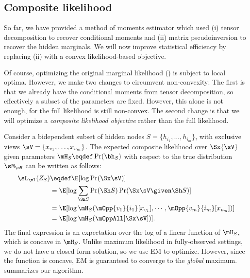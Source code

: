 \subsection{Composite likelihood}
\label{sec:piecewise}

So far, we have provided a method of moments estimator
which used (i) tensor decomposition to recover conditional moments
and (ii) matrix pseudoinversion to recover the hidden marginals.
We will now improve statistical efficiency by replacing (ii)
with a convex likelihood-based objective.

Of course, optimizing the original marginal likelihood () is
subject to local optima.
However, we make two changes to circumvent non-convexity:
The first is that we already have the conditional moments from tensor decomposition,
so effectively a subset of the parameters are fixed.
However, this alone is not enough, for the full likelihood is still non-convex.
The second change is that we will optimize a
\emph{composite likelihood objective} \cite{lindsay88composite}
rather than the full likelihood.


Consider a bidependent subset of hidden nodes $S = \{h_{i_1}, \dots, h_{i_m}\}$, with
  exclusive views $\sV = \{x_{v_1}, \dots, x_{v_m}\}$. 
The expected composite likelihood over $\Sx{\sV}$ given parameters $\mH_S \eqdef \Pr(\bh_S)$
with respect to the true distribution $\sM_\sV$ can be written as follows:
\begin{align}
  \sL_\ml(Z_S) %
  &\eqdef \E[\log \Pr( \Sx \sV )] \nonumber \\
  &= \E[\log \sum_{\Sh S} \Pr(\Sh S) \Pr( \Sx \sV \given \Sh S )] \nonumber \\
  &= \E[\log \mH_S(\mOpp{v_1}{i_1} [x_{v_1}], \cdots, \mOpp{v_m}{i_m} [x_{v_m}])] \nonumber \\
  &= \E[\log \mH_S(\mOppAll[\Sx\sV])]. \label{eqn:piecewise-obj}
\end{align}
The final expression is an expectation over the log of a linear function of
$\mH_S$, which is concave in $\mH_S$.  
Unlike maximum likelihood in fully-observed settings,
we do not have a closed-form solution, so we use EM to optimize.
However, since the function is concave, EM is guaranteed to converge to
the \emph{global} maximum.
 summarizes our algorithm.

